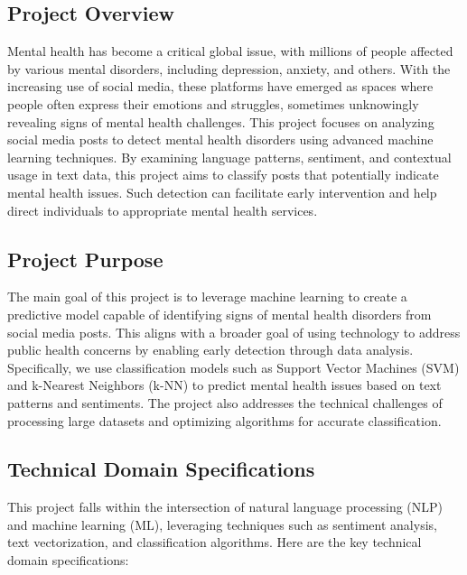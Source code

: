 \subsection{Project Overview}
\vspace{.1in}
\noindent
Mental health has become a critical global issue, with millions of people affected by various mental disorders, including depression, anxiety, and others. With the increasing use of social media, these platforms have emerged as spaces where people often express their emotions and struggles, sometimes unknowingly revealing signs of mental health challenges. This project focuses on analyzing social media posts to detect mental health disorders using advanced machine learning techniques. By examining language patterns, sentiment, and contextual usage in text data, this project aims to classify posts that potentially indicate mental health issues. Such detection can facilitate early intervention and help direct individuals to appropriate mental health services.

\subsection{Project Purpose}
\vspace{.1in}
\noindent
The main goal of this project is to leverage machine learning to create a predictive model capable of identifying signs of mental health disorders from social media posts. This aligns with a broader goal of using technology to address public health concerns by enabling early detection through data analysis. Specifically, we use classification models such as Support Vector Machines (SVM) and k-Nearest Neighbors (k-NN) to predict mental health issues based on text patterns and sentiments. The project also addresses the technical challenges of processing large datasets and optimizing algorithms for accurate classification.

\subsection{Technical Domain Specifications}
\vspace{.1in}
This project falls within the intersection of natural language processing (NLP) and machine learning (ML), leveraging techniques such as sentiment analysis, text vectorization, and classification algorithms. Here are the key technical domain specifications:

